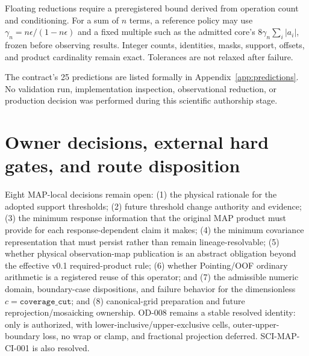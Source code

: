 \documentclass[10pt]{article}
\begin{document}
Floating reductions require a preregistered bound derived from operation count
and conditioning. For a sum of \(n\) terms, a reference policy may use
\(\gamma_n=n\epsilon/(1-n\epsilon)\) and a fixed multiple such as the admitted
core's \(8\gamma_n\sum_i|a_i|\), frozen before observing results. Integer
counts, identities, masks, support, offsets, and product cardinality remain
exact. Tolerances are not relaxed after failure.

The contract's 25 predictions are listed formally in
Appendix~\ref{app:predictions}. No validation run, implementation inspection,
observational reduction, or production decision was performed during this
scientific authorship stage.

\clearpage
\section{Owner decisions, external hard gates, and route disposition}

Eight MAP-local decisions remain open: (1) the physical rationale
for the adopted support thresholds; (2) future threshold change authority and
evidence; (3) the minimum response information that the original MAP product
must provide for each response-dependent claim it makes; (4) the minimum covariance
representation that must persist rather than remain lineage-resolvable; (5)
whether physical observation-map publication is an abstract obligation beyond
the effective v0.1 required-product rule; (6) whether Pointing/OOF ordinary
arithmetic is a registered reuse of this operator; and (7) the admissible
numeric domain, boundary-case dispositions, and failure behavior for the
dimensionless \(c=\texttt{coverage\_cut}\); and (8) canonical-grid preparation
and future reprojection/mosaicking ownership. OD-008 remains a stable resolved
identity: only \SCIMapOneHotProfile{} is authorized, with
lower-inclusive/upper-exclusive cells, outer-upper-boundary loss, no wrap or
clamp, and fractional projection deferred. SCI-MAP-CI-001 is also resolved.
\end{document}
